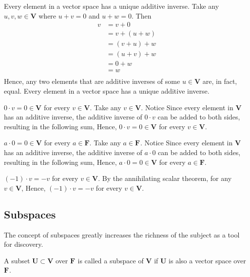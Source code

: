 \documentclass[11pt]{article} %
\newcommand\F[1]{\mathbf{F^{#1}}}
\newcommand\U{\mathbf{U}}
\newcommand\V{\mathbf{V}}
\begin{document}
{Every element in a vector space has a unique additive inverse.}
{
Take any $u, v, w \in \V$ where $u + v = 0$ and $u + w = 0$. Then
	\begin{align*}
	v 	&= v + 0 \\
		&= v + (u + w) \\
		&= (v + u) + w \\
		&= (u + v) + w \\
		&= 0 + w \\
		&= w \\
	\end{align*}
Hence, any two elements that are additive inverses of some $u \in \V$ are, in fact, equal. Every element in a vector space has a unique additive inverse.
}

{$0 \cdot v = 0 \in \V$ for every $v \in \V$.}
{
Take any $v \in \V$. Notice 
Since every element in $\V$ has an additive inverse, the additive inverse of $0 \cdot v$ can be added to both sides, resulting in the following sum, 
Hence, $0 \cdot v = 0 \in \V$ for every $v \in \V$. 
}

{$a \cdot 0  = 0 \in \V$ for every $a \in \textbf{F}$.}
{
Take any $a \in \F{}$. Notice 
Since every element in $\V$ has an additive inverse, the additive inverse of $a \cdot 0$ can be added to both sides, resulting in the following sum,
Hence, $a \cdot 0  = 0 \in \V$ for every $a \in \textbf{F}$.
}

{$(-1) \cdot v = -v$ for every $v \in \V$.}
{
By the annihilating scalar theorem, for any $v \in \V$, 
Hence, $(-1) \cdot v = -v$ for every $v \in \V$.
}

\clearpage
\subsection{Subspaces}

The concept of subspaces greatly increases the richness of the subject as a tool for discovery.

{A subset $\U \subset \V$ over $\F{}$ is called a subspace of $\V$ if $\U$ is also a vector space over $\F{}$.}
\end{document}
